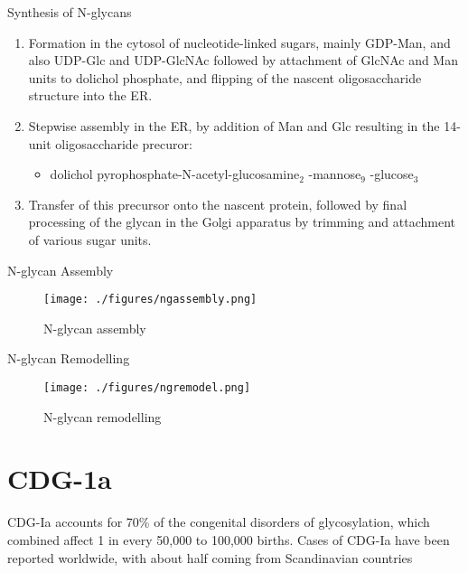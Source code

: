 \documentclass[presentation, smaller]{beamer}
\begin{document}
\begin{frame}[label={sec:org22880d0}]{Synthesis of N-glycans}
\begin{enumerate}
\item Formation in the cytosol of nucleotide-linked sugars, mainly
GDP-Man, and also UDP-Glc and UDP-GlcNAc followed by attachment of
GlcNAc and Man units to dolichol phosphate, and flipping of the
nascent oligosaccharide structure into the ER.
\item Stepwise assembly in the ER, by addition of Man and Glc resulting
in the 14-unit oligosaccharide precuror:
\begin{itemize}
\item dolichol pyrophosphate-N-acetyl-glucosamine\(_{\text{2}}\) -mannose\(_{\text{9}}\) -glucose\(_{\text{3}}\)
\end{itemize}
\item Transfer of this precursor onto the nascent protein, followed by
final processing of the glycan in the Golgi apparatus by trimming
and attachment of various sugar units.
\end{enumerate}
\end{frame}

\begin{frame}[label={sec:org92471c6}]{N-glycan Assembly}
\begin{figure}[htbp]
\centering
\texttt{[image: ./figures/ngassembly.png]}
\caption{\label{fig:orgae37c65}
N-glycan assembly}
\end{figure}
\end{frame}

\begin{frame}[label={sec:org3d8ee96}]{N-glycan Remodelling}
\begin{figure}[htbp]
\centering
\texttt{[image: ./figures/ngremodel.png]}
\caption{\label{fig:orgbd5f0e2}
N-glycan remodelling}
\end{figure}
\end{frame}


\section{CDG-1a}
\label{sec:orga3c9e3d}
CDG-Ia accounts for 70\% of the congenital disorders of glycosylation, which combined affect 1 in every 50,000 to 100,000 births. Cases of CDG-Ia have been reported worldwide, with about half coming from Scandinavian countries
\end{document}
